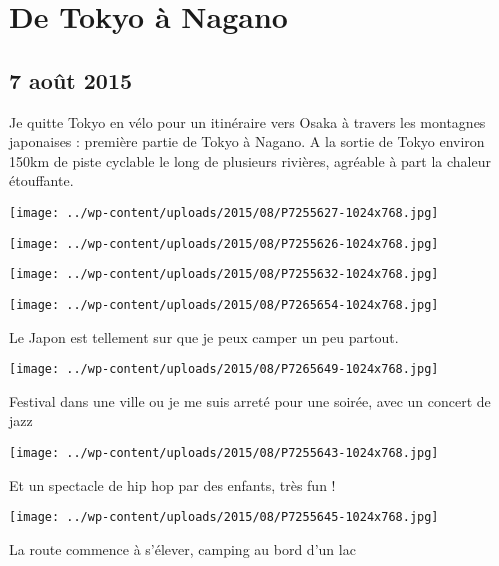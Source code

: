 \chapter{De Tokyo à Nagano}
\section*{7 août 2015}
Je quitte Tokyo en vélo pour un itinéraire vers Osaka à travers les montagnes japonaises : première partie de Tokyo à Nagano. \newline
 A la sortie de Tokyo environ 150km de piste cyclable le long de plusieurs rivières, agréable à part la chaleur étouffante. \newline
 \newline
\centerline{\texttt{[image: ../wp-content/uploads/2015/08/P7255627-1024x768.jpg]} } 
 \newline
 \newline
\centerline{\texttt{[image: ../wp-content/uploads/2015/08/P7255626-1024x768.jpg]} } 
 \newline
 \newline
\centerline{\texttt{[image: ../wp-content/uploads/2015/08/P7255632-1024x768.jpg]} } 
 \newline
 \newline
\centerline{\texttt{[image: ../wp-content/uploads/2015/08/P7265654-1024x768.jpg]} } 
 \newline
 Le Japon est tellement sur que je peux camper un peu partout. \newline
 \newline
\centerline{\texttt{[image: ../wp-content/uploads/2015/08/P7265649-1024x768.jpg]} } 
 \newline
 Festival dans une ville ou je me suis arreté pour une soirée, avec un concert de jazz \newline
 \newline
\centerline{\texttt{[image: ../wp-content/uploads/2015/08/P7255643-1024x768.jpg]} } 
 \newline
 Et un spectacle de hip hop par des enfants, très fun ! \newline
 \newline
\centerline{\texttt{[image: ../wp-content/uploads/2015/08/P7255645-1024x768.jpg]} } 
 \newline
 La route commence à s'élever, camping au bord d'un lac \newline
 \newline
